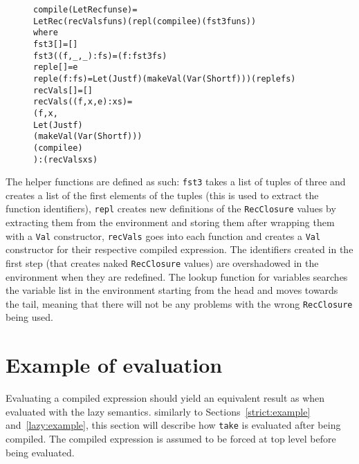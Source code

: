 \begin{figure}[H]
\begin{alltt}
  compile (LetRec funs e) =
    LetRec (recVals funs) (repl (compile e) (fst3 funs))
    where
      fst3 []           = []
      fst3 ((f,_,_):fs) = (f:fst3 fs)
      repl e []     = e
      repl e (f:fs) = Let (Just f) (makeVal (Var (Short f))) (repl e fs)
      recVals []           = []
      recVals ((f,x,e):xs) =
        (f,x,
         Let (Just f)
         (makeVal (Var (Short f)))
         (compile e)
        ):(recVals xs)
\end{alltt}
\end{figure}

\noindent The helper functions are defined as such: \texttt{fst3} takes a list
of tuples of three and creates a list of the first elements of the tuples (this
is used to extract the function identifiers), \texttt{repl} creates new
definitions of the \texttt{RecClosure} values by extracting them from the
environment and storing them after wrapping them with a \texttt{Val}
constructor, \texttt{recVals} goes into each function and creates a \texttt{Val}
constructor for their respective compiled expression.
The identifiers created in the first step (that creates naked
\texttt{RecClosure} values) are
overshadowed in the environment when they are redefined. The lookup function
for variables searches the variable list in the environment starting from the
head and moves towards the tail, meaning that there will not be any problems
with the wrong \texttt{RecClosure} being used.

\section{Example of evaluation}
\label{com:example}
Evaluating a compiled expression should yield an equivalent result as when
evaluated with the lazy semantics. similarly to Sections~\ref{strict:example}
and~\ref{lazy:example}, this section will describe how \texttt{take}
is evaluated after being compiled. The compiled expression is assumed to be
forced at top level before being evaluated.

